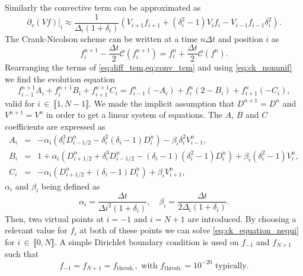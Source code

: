 \documentclass[11pt]{article}
\begin{document}
%
Similarly the convective term can be approximated as
%
\begin{equation}\label{eq:conv_tem}
  \partial_{v}(Vf) |_i \approx \dfrac{1}{\Delta_i(1+\delta_i)} \left( V_{i+1}f_{i+1} + (\delta_i^2 -1) V_i f_i - V_{i-1} f_{i-1} \delta_i^2\right) .
\end{equation}
%
The Crank-Nicolson scheme can be written at a time $n\Delta t$ and position $i$ as
%
\begin{equation}\label{eq:ck_nonunif}
  f_i^{n+1} - \dfrac{\Delta t}{2} \mathcal{C}(f_i^{n+1}) = f_i^{n} + \dfrac{\Delta t}{2} \mathcal{C}(f^{n}).
\end{equation}
%
Rearranging the terms of \cref{eq:diff_tem,eq:conv_tem} and using \cref{eq:ck_nonunif} we find  the evolution equation
%
\begin{equation}\label{eq:ck_equation_nequi}
  f_{i-1}^{n+1} A_i + f_i^{n+1} B_i + f_{i+1}^{n+1} C_i = f_{i-1}^{n}(-A_i) + f_i^{n} (2 - B_i) + f_{i+1}^{n}(-C_i),
\end{equation}
%
valid for $i \, \in \, \llbracket 1, N-1 \rrbracket $. We made the implicit assumption that $D^{n+1} = D^{n}$ and $V^{n+1} = V^{n}$ in order to get a linear system of equations. The $A$,  $B$ and $C$ coefficients are expressed as 
%
\begin{eqnarray}
  A_i &=& - \alpha_i \left( \delta_i^3 D^{n}_{i-1/2} - \delta_i^2 (\delta_i-1) D^{n}_i\right) - \beta_i \delta_i^2V^{n}_{i-1} , \\
  B_i &=& 1  + \alpha_i \left(  D^{n}_{i+1/2}  + \delta_i^3 D^{n}_{i-1/2} - (\delta_i-1)(\delta_i^2-1) D^{n}_i \right) + \beta_i (\delta_i^2 -1) V^{n}_i, \\
  C_i &=& -\alpha_i \left( D^{n}_{i+1/2} + (\delta_i - 1)D^{n}_i \right) + \beta_i V^{n}_{i+1},
\end{eqnarray}
%
$\alpha_i$ and $\beta_i$ being defined as 
%
\begin{equation}
  \alpha_i = \dfrac{\Delta t}{\Delta i ^2 (1+\delta_i)}, \quad \beta_i = \dfrac{\Delta t}{2 \Delta_i (1 + \delta_i)}.
\end{equation}
%
Then, two virtual points at $i=-1$ and $i=N+1$ are introduced. By choosing a relevant value for $f_i$ at both of these points we can solve \cref{eq:ck_equation_nequi} for $i \, \in \,  \llbracket 0, N \rrbracket $. A simple Dirichlet boundary condition is used on $f_{-1}$ and $f_{N+1}$ such that
%
\begin{equation}\label{eq:dirichlet_bc}
  f_{-1} = f_{N+1} = f_{\text{thresh.}}, \,\, \text{with} \,\, f_{\text{thresh.}} = 10^{-20} \,\, \text{typically}.
\end{equation}
\end{document}
